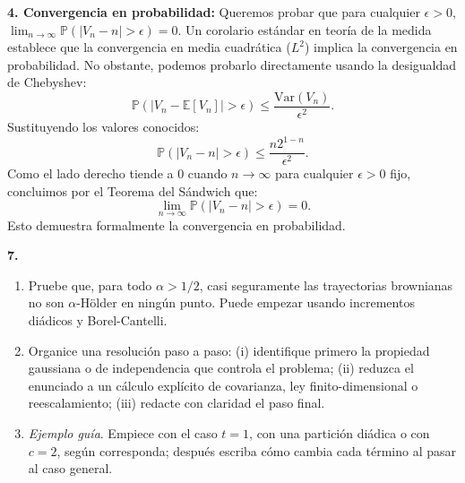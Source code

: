\documentclass[11pt, letterpaper]{article}
\begin{document}
\begin{solucion}
    \textbf{4. Convergencia en probabilidad:}
    Queremos probar que para cualquier $\epsilon > 0$, $\lim_{n \to \infty} \mathbb{P}(|V_n - n| > \epsilon) = 0$.
    Un corolario estándar en teoría de la medida establece que la convergencia en media cuadrática ($L^2$) implica la convergencia en probabilidad. No obstante, podemos probarlo directamente usando la desigualdad de Chebyshev:
    \[ \mathbb{P}(|V_n - \mathbb{E}[V_n]| > \epsilon) \le \frac{\text{Var}(V_n)}{\epsilon^2}. \]
    Sustituyendo los valores conocidos:
    \[ \mathbb{P}(|V_n - n| > \epsilon) \le \frac{n 2^{1-n}}{\epsilon^2}. \]
    Como el lado derecho tiende a $0$ cuando $n \to \infty$ para cualquier $\epsilon > 0$ fijo, concluimos por el Teorema del Sándwich que:
    \[ \lim_{n \to \infty} \mathbb{P}(|V_n - n| > \epsilon) = 0. \]
    Esto demuestra formalmente la convergencia en probabilidad.
\end{solucion}

\newpage

\begin{ejercicio}
    \textbf{7.} 
    \begin{enumerate}
        \item Pruebe que, para todo $\alpha > 1/2$, casi seguramente las trayectorias brownianas no son $\alpha$-Hölder en ningún punto. Puede empezar usando incrementos diádicos y Borel-Cantelli.
        \item Organice una resolución paso a paso: (i) identifique primero la propiedad gaussiana o de independencia que controla el problema; (ii) reduzca el enunciado a un cálculo explícito de covarianza, ley finito-dimensional o reescalamiento; (iii) redacte con claridad el paso final.
        \item \textit{Ejemplo guía}. Empiece con el caso $t = 1$, con una partición diádica o con $c = 2$, según corresponda; después escriba cómo cambia cada término al pasar al caso general.
    \end{enumerate}
\end{ejercicio}

\vspace{5mm}
\end{document}
